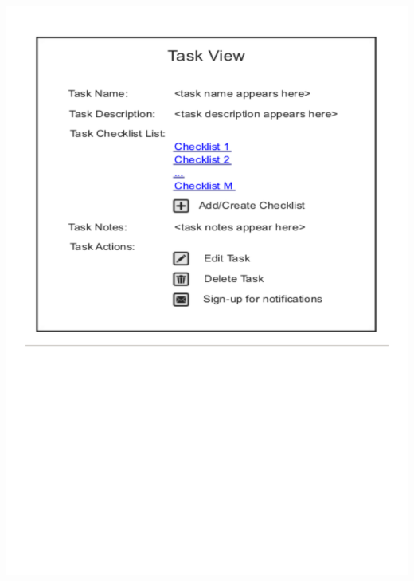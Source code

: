 \documentclass{article}
\begin{document}
\begin{center}
\includegraphics[trim = 0cm 5cm 0cm 0cm, clip=true, scale=0.7]{images/taskview}
\end{center}
\end{document}
